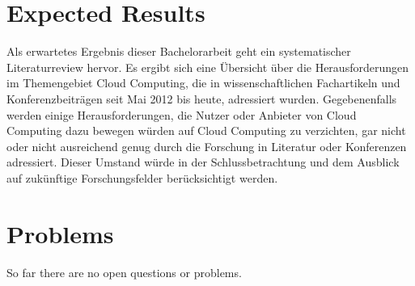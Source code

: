 \documentclass[
	a4paper,
	oneside,
	12pt,
	liststotocnumbered
]{article}
\begin{document}
\section{Expected Results}
Als erwartetes Ergebnis dieser Bachelorarbeit geht ein systematischer Literaturreview hervor. Es ergibt sich eine Übersicht über die Herausforderungen im Themengebiet Cloud Computing, die in wissenschaftlichen Fachartikeln und Konferenzbeiträgen seit Mai 2012 bis heute, adressiert wurden. Gegebenenfalls werden einige Herausforderungen, die Nutzer oder Anbieter von Cloud Computing dazu bewegen würden auf Cloud Computing zu verzichten, gar nicht oder nicht ausreichend genug durch die Forschung in Literatur oder Konferenzen adressiert. Dieser Umstand würde in der Schlussbetrachtung und dem Ausblick auf zukünftige Forschungsfelder berücksichtigt werden.

\section{Problems}
So far there are no open questions or problems.

\newpage
\printbibliography[title={Literaturverzeichnis}]
\end{document}
